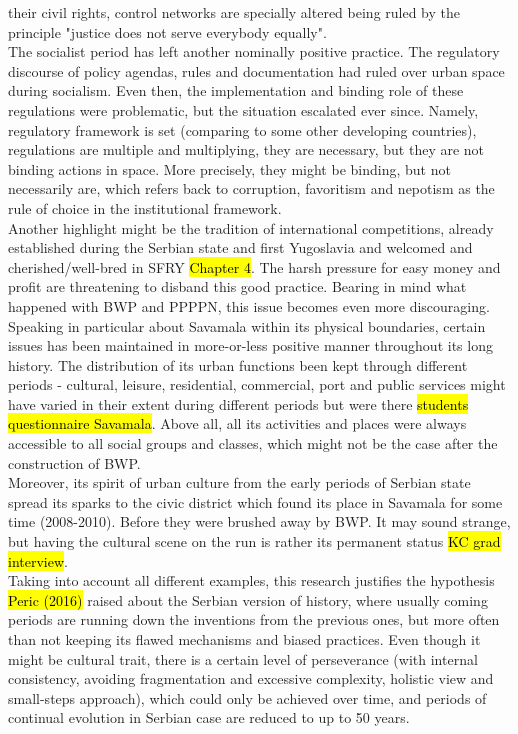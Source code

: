 \documentclass[11pt]{report}
\begin{document}
their civil rights, control networks are specially altered being ruled by the principle "justice does not serve everybody equally".
\\
The socialist period has left another nominally positive practice. The regulatory discourse of policy agendas, rules and documentation had ruled over urban space during socialism. Even then, the implementation and binding role of these regulations were problematic, but the situation escalated ever since.
Namely, regulatory framework is set (comparing to some other developing countries), regulations are multiple and multiplying, they are necessary, but they are not binding actions in space. 
More precisely, they might be binding, but not necessarily are, which  refers back to corruption, favoritism and nepotism as the rule of choice in the institutional framework.
\\
Another highlight might be the tradition of international competitions, already established during the Serbian state and first Yugoslavia and welcomed and cherished/well-bred in SFRY \hl{Chapter 4}.
The harsh pressure for easy money and profit are threatening  to disband this good practice. Bearing in mind what happened with BWP and PPPPN, this issue becomes even more discouraging.
\\
Speaking in particular about Savamala within its physical boundaries, certain issues has been maintained in more-or-less positive manner throughout its long history. The distribution of its urban functions been kept through different periods  - cultural, leisure, residential, commercial, port and public services might have varied in their extent during different periods but were there \hl{students questionnaire Savamala}. Above all, all its activities and places were always accessible to all social groups and classes, which might not be the case after the construction of BWP.
\\
Moreover, its spirit of urban culture from the early periods of Serbian state spread its sparks to the civic district which found its place in Savamala for some time (2008-2010).
Before they were brushed away by BWP.
It may sound strange, but having the cultural scene on the run is rather its permanent status \hl{KC grad interview}.
\\
Taking into account all different examples, this research justifies the hypothesis \hl{Peric (2016)} raised about the Serbian version of history, where usually coming periods are running down the inventions from the previous ones, but more often than not keeping its flawed mechanisms and biased practices.
Even though it might be cultural trait, there is a certain level of perseverance (with internal consistency, avoiding fragmentation and excessive complexity, holistic view and small-steps approach), which could only be achieved over time, and periods of continual evolution in Serbian case are reduced to up to 50 years.
  
\end{document}
